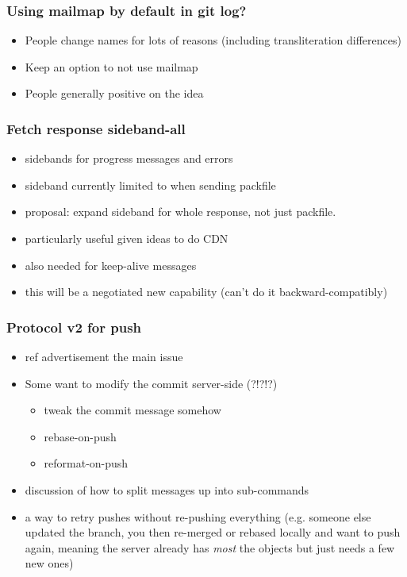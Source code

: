 \documentclass[t]{beamer}
\begin{document}

\begin{frame}
  \frametitle{Using mailmap by default in git log?}

  \begin{itemize}
    \item People change names for lots of reasons (including transliteration
          differences)
    \item Keep an option to not use mailmap
    \item People generally positive on the idea
  \end{itemize}

\end{frame}


\begin{frame}
  \frametitle{Fetch response sideband-all}

  \begin{itemize}
    \item sidebands for progress messages and errors
    \item sideband currently limited to when sending packfile
    \item proposal: expand sideband for whole response, not just packfile.
    \item particularly useful given ideas to do CDN
    \item also needed for keep-alive messages
    \item this will be a negotiated new capability (can't do it
          backward-compatibly)
  \end{itemize}

\end{frame}


\begin{frame}
  \frametitle{Protocol v2 for push}

  \begin{itemize}
    \item ref advertisement the main issue
    \item Some want to modify the commit server-side (?!?!?)
    \begin{itemize}
      \item tweak the commit message somehow
      \item rebase-on-push
      \item reformat-on-push
    \end{itemize}
    \item discussion of how to split messages up into sub-commands
    \item a way to retry pushes without re-pushing everything (e.g. someone
      else updated the branch, you then re-merged or rebased locally and want
      to push again, meaning the server already has \textit{most} the objects
      but just needs a few new ones)
  \end{itemize}

\end{frame}
\end{document}
